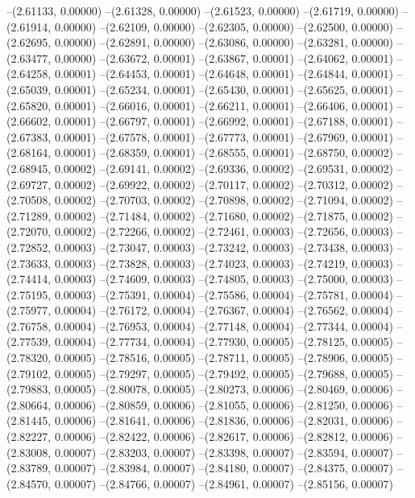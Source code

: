 --(2.61133, 0.00000)
--(2.61328, 0.00000)
--(2.61523, 0.00000)
--(2.61719, 0.00000)
--(2.61914, 0.00000)
--(2.62109, 0.00000)
--(2.62305, 0.00000)
--(2.62500, 0.00000)
--(2.62695, 0.00000)
--(2.62891, 0.00000)
--(2.63086, 0.00000)
--(2.63281, 0.00000)
--(2.63477, 0.00000)
--(2.63672, 0.00001)
--(2.63867, 0.00001)
--(2.64062, 0.00001)
--(2.64258, 0.00001)
--(2.64453, 0.00001)
--(2.64648, 0.00001)
--(2.64844, 0.00001)
--(2.65039, 0.00001)
--(2.65234, 0.00001)
--(2.65430, 0.00001)
--(2.65625, 0.00001)
--(2.65820, 0.00001)
--(2.66016, 0.00001)
--(2.66211, 0.00001)
--(2.66406, 0.00001)
--(2.66602, 0.00001)
--(2.66797, 0.00001)
--(2.66992, 0.00001)
--(2.67188, 0.00001)
--(2.67383, 0.00001)
--(2.67578, 0.00001)
--(2.67773, 0.00001)
--(2.67969, 0.00001)
--(2.68164, 0.00001)
--(2.68359, 0.00001)
--(2.68555, 0.00001)
--(2.68750, 0.00002)
--(2.68945, 0.00002)
--(2.69141, 0.00002)
--(2.69336, 0.00002)
--(2.69531, 0.00002)
--(2.69727, 0.00002)
--(2.69922, 0.00002)
--(2.70117, 0.00002)
--(2.70312, 0.00002)
--(2.70508, 0.00002)
--(2.70703, 0.00002)
--(2.70898, 0.00002)
--(2.71094, 0.00002)
--(2.71289, 0.00002)
--(2.71484, 0.00002)
--(2.71680, 0.00002)
--(2.71875, 0.00002)
--(2.72070, 0.00002)
--(2.72266, 0.00002)
--(2.72461, 0.00003)
--(2.72656, 0.00003)
--(2.72852, 0.00003)
--(2.73047, 0.00003)
--(2.73242, 0.00003)
--(2.73438, 0.00003)
--(2.73633, 0.00003)
--(2.73828, 0.00003)
--(2.74023, 0.00003)
--(2.74219, 0.00003)
--(2.74414, 0.00003)
--(2.74609, 0.00003)
--(2.74805, 0.00003)
--(2.75000, 0.00003)
--(2.75195, 0.00003)
--(2.75391, 0.00004)
--(2.75586, 0.00004)
--(2.75781, 0.00004)
--(2.75977, 0.00004)
--(2.76172, 0.00004)
--(2.76367, 0.00004)
--(2.76562, 0.00004)
--(2.76758, 0.00004)
--(2.76953, 0.00004)
--(2.77148, 0.00004)
--(2.77344, 0.00004)
--(2.77539, 0.00004)
--(2.77734, 0.00004)
--(2.77930, 0.00005)
--(2.78125, 0.00005)
--(2.78320, 0.00005)
--(2.78516, 0.00005)
--(2.78711, 0.00005)
--(2.78906, 0.00005)
--(2.79102, 0.00005)
--(2.79297, 0.00005)
--(2.79492, 0.00005)
--(2.79688, 0.00005)
--(2.79883, 0.00005)
--(2.80078, 0.00005)
--(2.80273, 0.00006)
--(2.80469, 0.00006)
--(2.80664, 0.00006)
--(2.80859, 0.00006)
--(2.81055, 0.00006)
--(2.81250, 0.00006)
--(2.81445, 0.00006)
--(2.81641, 0.00006)
--(2.81836, 0.00006)
--(2.82031, 0.00006)
--(2.82227, 0.00006)
--(2.82422, 0.00006)
--(2.82617, 0.00006)
--(2.82812, 0.00006)
--(2.83008, 0.00007)
--(2.83203, 0.00007)
--(2.83398, 0.00007)
--(2.83594, 0.00007)
--(2.83789, 0.00007)
--(2.83984, 0.00007)
--(2.84180, 0.00007)
--(2.84375, 0.00007)
--(2.84570, 0.00007)
--(2.84766, 0.00007)
--(2.84961, 0.00007)
--(2.85156, 0.00007)
